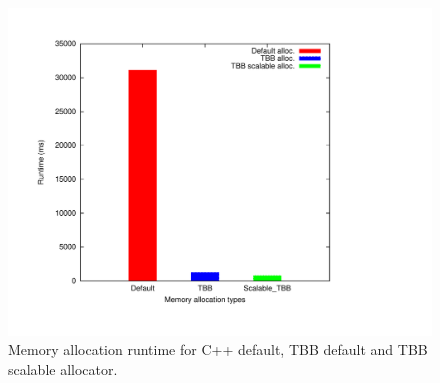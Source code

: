 \begin{figure}
	\centering
  	\includegraphics[scale=0.3]{../plots/mem_alloc/mem_alloc.pdf}
	\caption{Memory allocation runtime for C++ default, TBB default and TBB scalable allocator.}
	\label{fig:mem_alloc}
\end{figure}
